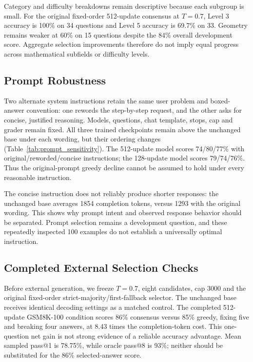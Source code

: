 \documentclass[conference]{IEEEtran}
\begin{document}
Category and difficulty breakdowns remain descriptive because each subgroup is small. For the original fixed-order 512-update consensus at $T=0.7$, Level 3 accuracy is 100\% on 34 questions and Level 5 accuracy is 69.7\% on 33. Geometry remains weaker at 60\% on 15 questions despite the 84\% overall development score. Aggregate selection improvements therefore do not imply equal progress across mathematical subfields or difficulty levels.

\subsection{Prompt Robustness}

Two alternate system instructions retain the same user problem and boxed-answer convention: one rewords the step-by-step request, and the other asks for concise, justified reasoning. Models, questions, chat template, stops, cap and grader remain fixed. All three trained checkpoints remain above the unchanged base under each wording, but their ordering changes (Table~\ref{tab:prompt_sensitivity}). The 512-update model scores 74/80/77\% with original/reworded/concise instructions; the 128-update model scores 79/74/76\%. Thus the original-prompt greedy decline cannot be assumed to hold under every reasonable instruction.

The concise instruction does not reliably produce shorter responses: the unchanged base averages 1854 completion tokens, versus 1293 with the original wording. This shows why prompt intent and observed response behavior should be separated. Prompt selection remains a development question, and these repeatedly inspected 100 examples do not establish a universally optimal instruction.

\subsection{Completed External Selection Checks}

Before external generation, we freeze $T=0.7$, eight candidates, cap 3000 and the original fixed-order strict-majority/first-fallback selector. The unchanged base receives identical decoding settings as a matched control. The completed 512-update GSM8K-100 condition scores 86\% consensus versus 85\% greedy, fixing five and breaking four answers, at 8.43 times the completion-token cost. This one-question net gain is not strong evidence of a reliable accuracy advantage. Mean sampled pass@1 is 78.75\%, while oracle pass@8 is 93\%; neither should be substituted for the 86\% selected-answer score.
\end{document}
